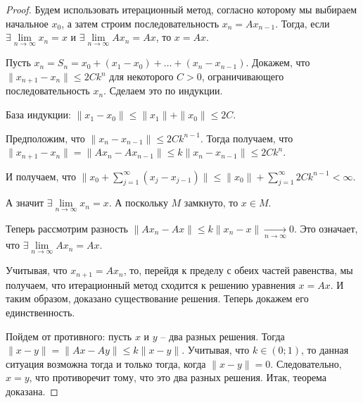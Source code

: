 \begin{proof}
	Будем использовать итерационный метод, согласно которому мы выбираем начальное $x_0$, а затем строим последовательность $x_n = Ax_{n-1}$. Тогда, если $\exists \lim\limits_{n \rightarrow \infty} x_n = x$ и $\exists \lim\limits_{n \rightarrow \infty} Ax_n = Ax$, то $x = Ax$.
	
		Пусть $x_n = S_n = x_0 + (x_1 - x_0) + \ldots + (x_n - x_{n-1})$.
		Докажем, что $\|x_{n+1} - x_n\| \leqslant 2Ck^n$ для некоторого $C > 0$, ограничивающего последовательность $x_n$. Сделаем это по индукции.
		
		База индукции: $\|x_1 - x_0\| \leqslant \|x_1\| + \|x_0\| \leqslant 2C$.
		
		Предположим, что $\|x_n - x_{n-1}\| \leqslant 2Ck^{n-1}$. Тогда получаем, что $\|x_{n+1} - x_n\| = \|Ax_n - Ax_{n-1}\| \leqslant k \|x_n - x_{n-1}\| \leqslant 2Ck^n$.
		
		И получаем, что $\|x_0 + \sum\limits_{j = 1}^{\infty} (x_j - x_{j-1})\| \leqslant \|x_0\| + \sum\limits_{j = 1}^{\infty} 2Ck^{n-1} < \infty$. 
		
		А значит $\exists \lim\limits_{n \rightarrow \infty} x_n = x$. А поскольку $M$ замкнуто, то $x \in M$. 
		
		Теперь рассмотрим разность $\|Ax_n - Ax\| \leqslant k\|x_n - x\| \underset{n \rightarrow \infty}{\longrightarrow} 0$. Это означает, что $\exists \lim\limits_{n \rightarrow \infty} Ax_n = Ax$. 
		
		Учитывая, что $x_{n+1} = Ax_n$, то, перейдя к пределу с обеих частей равенства, мы получаем, что итерационный метод сходится к решению уравнения $x = Ax$. И таким образом, доказано существование решения. Теперь докажем его единственность.
		
		Пойдем от противного: пусть $x$ и $y$ -- два разных решения. Тогда $\|x - y\| = \|Ax - Ay\| \leqslant k \|x - y\|$. Учитывая, что $k \in (0; 1)$, то данная ситуация возможна тогда и только тогда, когда $\|x - y\| = 0$. Следовательно, $x = y$, что противоречит тому, что это два разных решения. Итак, теорема доказана.
\end{proof}